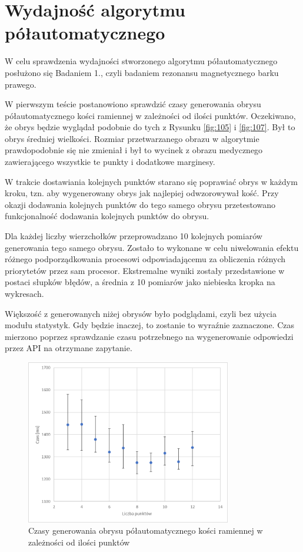 \documentclass[a4paper,11pt,twoside,openright]{report}
\theoremstyle{definition}
\begin{document}
\section {Wydajność algorytmu półautomatycznego}

W celu sprawdzenia wydajności stworzonego algorytmu półautomatycznego posłużono się Badaniem 1., czyli badaniem rezonansu magnetycznego barku prawego.

W pierwszym teście postanowiono sprawdzić czasy generowania obrysu półautomatycznego kości ramiennej w zależności od ilości punktów. Oczekiwano, że obrys będzie wyglądał podobnie do tych z Rysunku \ref{fig:105} i \ref{fig:107}. Był to obrys średniej wielkości. Rozmiar przetwarzanego obrazu w algorytmie prawdopodobnie się nie zmieniał i był to wycinek z obrazu medycznego zawierającego wszystkie te punkty i dodatkowe marginesy.

W trakcie dostawiania kolejnych punktów starano się poprawiać obrys w każdym kroku, tzn. aby wygenerowany obrys jak najlepiej odwzorowywał kość. Przy okazji dodawania kolejnych punktów do tego samego obrysu przetestowano funkcjonalność dodawania kolejnych punktów do obrysu.

Dla każdej liczby wierzchołków przeprowadzano 10 kolejnych pomiarów generowania tego samego obrysu. Zostało to wykonane w celu niwelowania efektu różnego podporządkowania procesowi odpowiadającemu za obliczenia różnych priorytetów przez sam procesor. Ekstremalne wyniki zostały przedstawione w postaci słupków błędów, a średnia z 10 pomiarów jako niebieska kropka na wykresach.

Większość z generowanych niżej obrysów było podglądami, czyli bez użycia modułu statystyk. Gdy będzie inaczej, to zostanie to wyraźnie zaznaczone. Czas mierzono poprzez sprawdzanie czasu potrzebnego na wygenerowanie odpowiedzi przez API na otrzymane zapytanie.

\begin{figure}[h!]
	\center
	\includegraphics[width=0.8\textwidth]{testy_1}
	\caption{Czasy generowania obrysu półautomatycznego kości ramiennej w zależności od ilości punktów}
    	\label{fig:testy_1}
\end{figure}
\end{document}
